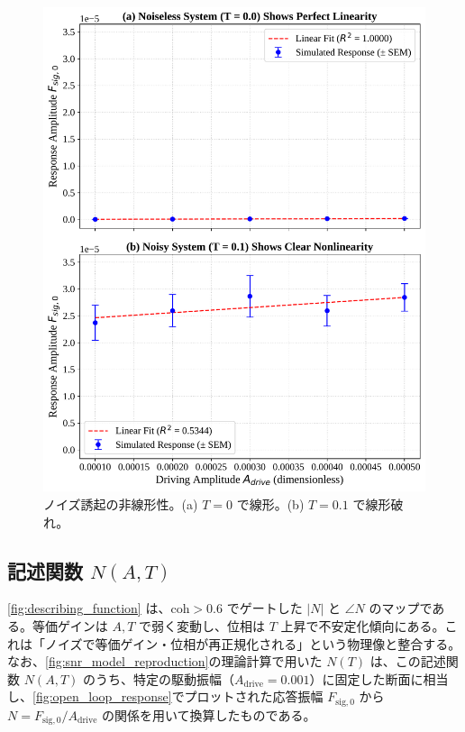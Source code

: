 \documentclass[a4paper,11pt,ja=standard,lualatex]{bxjsarticle}
\newcommand{\figref}[1]{\cref{#1}}
\begin{document}
\begin{figure}[H]
\centering
\includegraphics[width=0.8\linewidth]{fig4_nonlinearity_proof.pdf}
\caption{ノイズ誘起の非線形性。(a) $T=0$ で線形。(b) $T=0.1$ で線形破れ。}
\label{fig:nonlinearity_proof}
\end{figure}

\FloatBarrier

\subsection{記述関数 $N(A,T)$}
\figref{fig:describing_function} は、$\mathrm{coh}>0.6$ でゲートした $|N|$ と $\angle N$ のマップである。等価ゲインは $A,T$ で弱く変動し、位相は $T$ 上昇で不安定化傾向にある。これは「ノイズで等価ゲイン・位相が再正規化される」という物理像と整合する。なお、\figref{fig:snr_model_reproduction}の理論計算で用いた $N(T)$ は、この記述関数 $N(A,T)$ のうち、特定の駆動振幅（$A_{\mathrm{drive}}=0.001$）に固定した断面に相当し、\figref{fig:open_loop_response}でプロットされた応答振幅 $F_{\mathrm{sig},0}$ から $N = F_{\mathrm{sig},0}/A_{\mathrm{drive}}$ の関係を用いて換算したものである。
\end{document}
